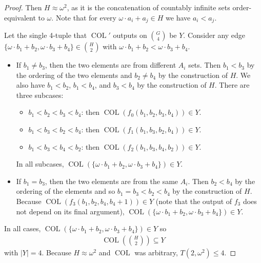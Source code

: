 \documentclass[10pt,a4paper]{amsart}
\newcommand{\COL}{\operatorname{COL}}
\newcommand{\commonconst}{a}
\newcommand{\oequiv}{\approx}
\newcommand{\om}{\omega}
\newcommand{\rareconst}{b}
\begin{document}
\begin{proof}
Then $H \oequiv \om^2$, as it is the concatenation of countably infinite sets order-equivalent to $\om$. Note that for every $\om \cdot \commonconst_i + \commonconst_j \in H$ we have $\commonconst_i < \commonconst_j$.

Let the single 4-tuple that $\COL'$ outputs on $\binom{G}{4}$ be $Y.$ Consider any edge $\{\om \cdot \rareconst_1 + \rareconst_2, \om \cdot \rareconst_3 + \rareconst_4\} \in \binom{H}{2}$ with $\om \cdot \rareconst_1 + \rareconst_2 < \om \cdot \rareconst_3 + \rareconst_4$. \begin{itemize}
\item If $\rareconst_1 \neq \rareconst_3$, then the two elements are from different $A_i$ sets. Then $\rareconst_1 < \rareconst_3$ by the ordering of the two elements and $\rareconst_2 \neq \rareconst_4$ by the construction of $H$. 
We also have $\rareconst_1 < \rareconst_2$, $\rareconst_1 < \rareconst_4$, and $\rareconst_3 < \rareconst_4$ by the construction of $H$.
There are three subcases: \begin{itemize}
    \item $\rareconst_1<\rareconst_2<\rareconst_3<\rareconst_4$: then $\COL(f_0(\rareconst_1,\rareconst_2,\rareconst_3,\rareconst_4)) \in Y.$
    \item $\rareconst_1<\rareconst_3<\rareconst_2<\rareconst_4$: then $\COL(f_1(\rareconst_1,\rareconst_3,\rareconst_2,\rareconst_4)) \in Y.$
    \item $\rareconst_1<\rareconst_3<\rareconst_4<\rareconst_2$: then $\COL(f_2(\rareconst_1,\rareconst_3,\rareconst_4,\rareconst_2)) \in Y.$
\end{itemize}
In all subcases, $\COL(\{\om \cdot \rareconst_1 + \rareconst_2, \om \cdot \rareconst_3 + \rareconst_4\}) \in Y.$
\item If $\rareconst_1 = \rareconst_3$, then the two elements are from the same $A_i.$ Then $\rareconst_2 < \rareconst_4$ by the ordering of the elements and so $\rareconst_1=\rareconst_3<\rareconst_2<\rareconst_4$ by the construction of $H$. Because $\COL(f_3(\rareconst_1,\rareconst_2,\rareconst_4,\rareconst_4+1)) \in Y$ (note that the output of $f_3$ does not depend on its final argument), $\COL(\{\om \cdot \rareconst_1 + \rareconst_2, \om \cdot \rareconst_3 + \rareconst_4\}) \in Y$.
\end{itemize}
In all cases, $\COL(\{\om \cdot \rareconst_1 + \rareconst_2, \om \cdot \rareconst_3 + \rareconst_4\}) \in Y$ so \begin{align*}
\COL\left(\binom{H}{2}\right) \subseteq Y
\end{align*} with $|Y|=4$. Because $H \oequiv \om^2$ and $\COL$ was arbitrary, $T\left(2, \om^2\right) \leq 4$.


\end{proof}
\end{document}
